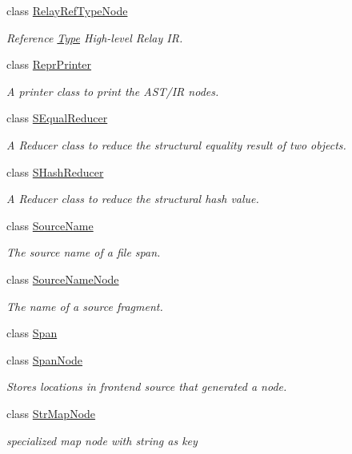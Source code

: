 \begin{DoxyCompactItemize}
class \hyperlink{classtvm_1_1RelayRefTypeNode}{Relay\+Ref\+Type\+Node}
\begin{DoxyCompactList}\small\item\em Reference \hyperlink{classtvm_1_1Type}{Type} High-\/level Relay IR. \end{DoxyCompactList}\item 
class \hyperlink{classtvm_1_1ReprPrinter}{Repr\+Printer}
\begin{DoxyCompactList}\small\item\em A printer class to print the A\+S\+T/\+IR nodes. \end{DoxyCompactList}\item 
class \hyperlink{classtvm_1_1SEqualReducer}{S\+Equal\+Reducer}
\begin{DoxyCompactList}\small\item\em A Reducer class to reduce the structural equality result of two objects. \end{DoxyCompactList}\item 
class \hyperlink{classtvm_1_1SHashReducer}{S\+Hash\+Reducer}
\begin{DoxyCompactList}\small\item\em A Reducer class to reduce the structural hash value. \end{DoxyCompactList}\item 
class \hyperlink{classtvm_1_1SourceName}{Source\+Name}
\begin{DoxyCompactList}\small\item\em The source name of a file span. \end{DoxyCompactList}\item 
class \hyperlink{classtvm_1_1SourceNameNode}{Source\+Name\+Node}
\begin{DoxyCompactList}\small\item\em The name of a source fragment. \end{DoxyCompactList}\item 
class \hyperlink{classtvm_1_1Span}{Span}
\item 
class \hyperlink{classtvm_1_1SpanNode}{Span\+Node}
\begin{DoxyCompactList}\small\item\em Stores locations in frontend source that generated a node. \end{DoxyCompactList}\item 
class \hyperlink{classtvm_1_1StrMapNode}{Str\+Map\+Node}
\begin{DoxyCompactList}\small\item\em specialized map node with string as key \end{DoxyCompactList}\item 

\end{DoxyCompactItemize}
